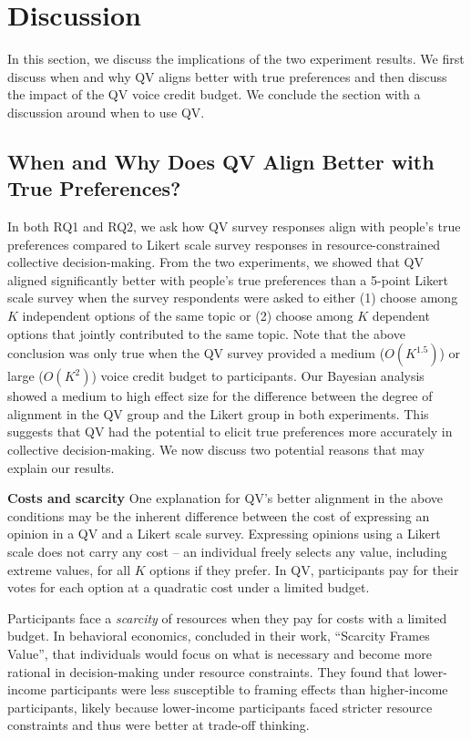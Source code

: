 \section{Discussion} \label{discussion}
In this section, we discuss the implications of the two experiment results. We first discuss when and why QV aligns better with true preferences and then discuss the impact of the QV voice credit budget. We conclude the section with a discussion around when to use QV. 

\subsection{When and Why Does QV Align Better with True Preferences?}
In both RQ1 and RQ2, we ask how QV survey responses align with people's true preferences compared to Likert scale survey responses in resource-constrained collective decision-making. From the two experiments, we showed that QV aligned significantly better with people's true preferences than a 5-point Likert scale survey when the survey respondents were asked to either (1) choose among $K$ independent options of the same topic or (2) choose among $K$ dependent options that jointly contributed to the same topic. Note that the above conclusion was only true when the QV survey provided a medium ($O(K^{1.5})$) or large ($O(K^{2})$) voice credit budget to participants. Our Bayesian analysis showed a medium to high effect size for the difference between the degree of alignment in the QV group and the Likert group in both experiments. This suggests that QV had the potential to elicit true preferences more accurately in collective decision-making. We now discuss two potential reasons that may explain our results.

\textbf{Costs and scarcity}
One explanation for QV's better alignment in the above conditions may be the inherent difference between the cost of expressing an opinion in a QV and a Likert scale survey. Expressing opinions using a Likert scale does not carry any cost -- an individual freely selects any value, including extreme values, for all $K$ options if they prefer. In QV, participants pay for their votes for each option at a quadratic cost under a limited budget. 

Participants face a \textit{scarcity} of resources when they pay for costs with a limited budget. In behavioral economics, \textcite{Shah2015a} concluded in their work, ``Scarcity Frames Value'', that individuals would focus on what is necessary and become more rational in decision-making under resource constraints. They found that lower-income participants were less susceptible to framing effects than higher-income participants, likely because lower-income participants faced stricter resource constraints and thus were better at trade-off thinking. 


